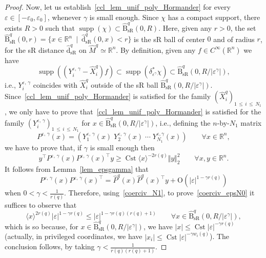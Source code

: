 \documentclass[10pt]{amsart}
\theoremstyle{definition}\newtheorem{defi}[theo]{Definition}\newtheorem{rema}[theo]{Remark}\newtheorem{exam}[theo]{Example}\newtheorem{exem}[theo]{Example}\newtheorem{nota}[theo]{Notation}
\newcommand*\R{\mathbb{R}}
\newcommand{\rmO}{\mathrm{O}}
\DeclareMathOperator{\supp}{supp}
\DeclareMathOperator{\Cst}{Cst}
\newcommand{\hatdsR}{\widehat{\mathrm{d}}_{\mathrm{sR}}}
\newcommand{\hatBsR}{\widehat{\mathrm{B}}_{\mathrm{sR}}}
\renewcommand{\geq}{\geqslant}
\renewcommand{\leq}{\leqslant}
\let\oldforall\forall
\renewcommand*{\forall}{\mathrel{\oldforall}}
\begin{document}
\begin{proof}
Now, let us establish~\eqref{ccl_lem_unif_poly_Hormander} for every $\varepsilon\in[-\varepsilon_0,\varepsilon_0]$, whenever $\gamma$ is small enough. Since $\chi$ has a compact support, there exists $R>0$ such that $\supp(\chi)\subset\hatBsR^{q}(0,R)$. Here, given any $r>0$, the set $\hatBsR^{q}(0,r) = \{x\in\R^n\ \mid\ \hatdsR^{q}(0,x)<r\}$ is the sR ball of center $0$ and of radius $r$, for the sR distance $\hatdsR^{q}$ on $\widehat M^{q}\simeq\R^n$. By definition, given any $f\in C^\infty(\R^n)$ we have
\[
\supp\left(\left(Y^{\varepsilon,\,\gamma}_i -\widehat X_i^{q}\right)f \right) \subset \supp\left(\delta_{\varepsilon^\gamma}^*\chi\right) \subset \hatBsR^{q}(0,R/\vert\varepsilon^\gamma\vert),
\]
i.e., $Y^{\varepsilon,\,\gamma}_i$ coincides with $\widehat X_i^{q}$ outside of the sR ball $\hatBsR^{q}(0,R/\vert\varepsilon^\gamma\vert)$. Since~\eqref{ccl_lem_unif_poly_Hormander} is satisfied for the family $(\widehat X_i^{q})_{1\,\leq\,i\,\leq\,N_1}$, we only have to prove that~\eqref{ccl_lem_unif_poly_Hormander} is satisfied for the family $(Y^{\varepsilon,\,\gamma}_i)_{1\,\leq\,i\,\leq\,N_1}$ for $x\in\hatBsR^{q}(0,R/\vert\varepsilon^\gamma\vert)$, i.e., defining the $n$-by-$N_1$ matrix
\[
P^{\varepsilon,\,\gamma}(x) =
\left(Y_1^{\varepsilon,\,\gamma}(x)\;  Y_2^{\varepsilon,\,\gamma}(x) \; \cdots \; Y_{N_1}^{\varepsilon,\gamma}(x)\right)
\qquad\forall x\in\R^n,
\]
we have to prove that, if $\gamma$ is small enough then
\begin{equation}\label{coerciv_epsN0}
y^\top P^{\varepsilon,\,\gamma}(x) P^{\varepsilon,\,\gamma}(x)^\top y \geq \Cst \langle x\rangle^{-2r(q)} \Vert y\Vert_2^2\qquad \forall x,y\in\R^n.
\end{equation}
It follows from Lemma~\ref{lem_epsgamma} that
\[
P^{\varepsilon,\,\gamma}(x) P^{\varepsilon,\,\gamma}(x)^\top = \widehat{P}^{q}(x) \widehat{P}^{q}(x)^\top y + \rmO\left(\vert\varepsilon\vert^{1-\gamma r(q)}\right)
\]
when $0<\gamma<\frac{1}{r(q)}$. Therefore, using~\eqref{coerciv_N1}, to prove~\eqref{coerciv_epsN0} it suffices to observe that
\[
\langle x\rangle^{2r(q)}\vert\varepsilon\vert^{1-\gamma r(q)} \leq \vert\varepsilon\vert^{1-\gamma r(q)(r(q)+1)}
\qquad\forall x\in\hatBsR^{q}(0,R/\vert\varepsilon^\gamma\vert),
\]
which is so because, for $x\in\hatBsR^{q}(0,R/\vert\varepsilon^\gamma\vert)$, we have $\vert x\vert\leq \Cst \vert\varepsilon\vert^{-\gamma r(q)}$ (actually, in privileged coordinates, we have $\vert x_i\vert\leq \Cst\vert\varepsilon\vert^{-\gamma w_i(q)}$). The conclusion follows, by taking $\gamma<\frac{1}{r(q)(r(q)+1)}$.
\end{proof}
\end{document}
